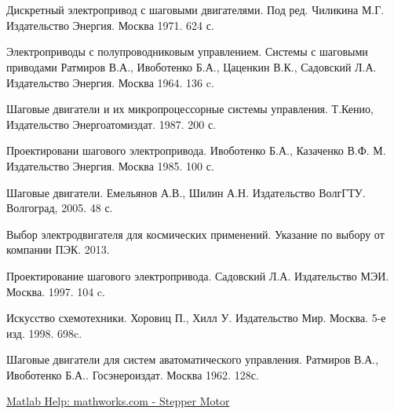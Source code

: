 \newpage
\section[Список использованной литературы]{}
\begin{thebibliography}{30}

     Дискретный электропривод с шаговыми двигателями.
                        Под ред. Чиликина М.Г.
                        Издательство Энергия. Москва 1971. 624 с.

     Электроприводы с полупроводниковым управлением. Системы с шаговыми приводами
                                    Ратмиров В.А., Ивоботенко Б.А., Цаценкин В.К., Садовский Л.А.
                                    Издательство Энергия. Москва 1964. 136 c.

     Шаговые двигатели и их микропроцессорные системы управления.
                    Т.Кенио,
                    Издательство Энергоатомиздат. 1987. 200 с.

     Проектировани шагового электропривода.
                                   Ивоботенко Б.А., Казаченко В.Ф. М.
                                   Издательство Энергия. Москва 1985. 100 с.

     Шаговые двигатели.
                              Емельянов А.В., Шилин А.Н.
                              Издательство ВолгГТУ. Волгоград, 2005. 48 с.

     Выбор электродвигателя для космических применений.
                                    Указание по выбору от компании ПЭК. 2013.

     Проектирование шагового электропривода.
                        Садовский Л.А. 
                        Издательство МЭИ. Москва. 1997. 104 c.

     Искусство схемотехники.
                          Хоровиц П., Хилл У.
                          Издательство Мир. Москва. 5-е изд. 1998. 698c.

     Шаговые двигатели для систем аватоматического управления.
                                                Ратмиров В.А., Ивоботенко Б.А..
                                                Госэнероиздат. Москва 1962. 128с.

     \href{http://www.mathworks.com/help/physmod/sps/powersys/ref/steppermotor.html}
                                            {Matlab Help: mathworks.com - Stepper Motor}


\end{thebibliography}
